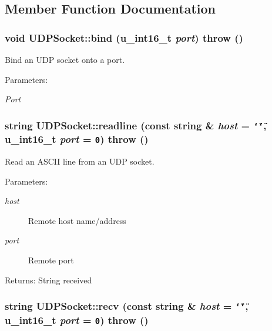 \subsection{Member Function Documentation}
\hypertarget{classUDPSocket_93ca497a5e6539eab464c4bd59a85de2}{
\subsubsection[{bind}]{\setlength{\rightskip}{0pt plus 5cm}void UDPSocket::bind (u\_\-int16\_\-t {\em port})  throw ()}}
\label{classUDPSocket_93ca497a5e6539eab464c4bd59a85de2}


Bind an UDP socket onto a port. 

\begin{Desc}
\item[Parameters:]
\begin{description}
\item[{\em Port}]\end{description}
\end{Desc}
\hypertarget{classUDPSocket_f1643ac194b84e7e8e99e536736f9ff6}{
\subsubsection[{readline}]{\setlength{\rightskip}{0pt plus 5cm}string UDPSocket::readline (const string \& {\em host} = {\tt \char`\"{}\char`\"{}}, \/  u\_\-int16\_\-t {\em port} = {\tt 0})  throw ()}}
\label{classUDPSocket_f1643ac194b84e7e8e99e536736f9ff6}


Read an ASCII line from an UDP socket. 

\begin{Desc}
\item[Parameters:]
\begin{description}
\item[{\em host}]Remote host name/address \item[{\em port}]Remote port \end{description}
\end{Desc}
\begin{Desc}
\item[Returns:]String received \end{Desc}
\hypertarget{classUDPSocket_55f7c286551162013cf4011405d5e8eb}{
\subsubsection[{recv}]{\setlength{\rightskip}{0pt plus 5cm}string UDPSocket::recv (const string \& {\em host} = {\tt \char`\"{}\char`\"{}}, \/  u\_\-int16\_\-t {\em port} = {\tt 0})  throw ()}}
\label{classUDPSocket_55f7c286551162013cf4011405d5e8eb}


